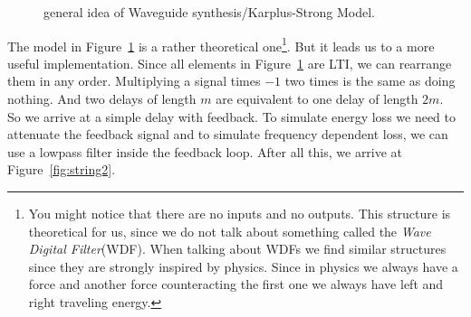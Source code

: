   \begin{figure}[htb]
  \centering
  \label{fig:string}

  \caption{general idea of Waveguide synthesis/Karplus-Strong Model.}
\end{figure}

The model in Figure~\ref{fig:string} is a rather theoretical one\footnote{You might notice that there are no inputs and no outputs. This structure is theoretical for us, since we do not talk about something called the \textit{Wave Digital Filter}(WDF). When talking about WDFs we find similar structures since they are strongly inspired by physics. Since in physics we always have a force and another force counteracting the first one we always have left and right traveling energy.}. But it leads us to a more useful implementation. Since all elements in Figure~\ref{fig:string} are LTI, we can rearrange them in any order. Multiplying a signal times $-1$ two times is the same as doing nothing. And two delays of length $m$ are equivalent to one delay of length $2m$.\\
So we arrive at a simple delay with feedback. To simulate energy loss we need to attenuate the feedback signal and to simulate frequency dependent loss, we can use a lowpass filter inside the feedback loop. After all this, we arrive at Figure~\ref{fig:string2}.

